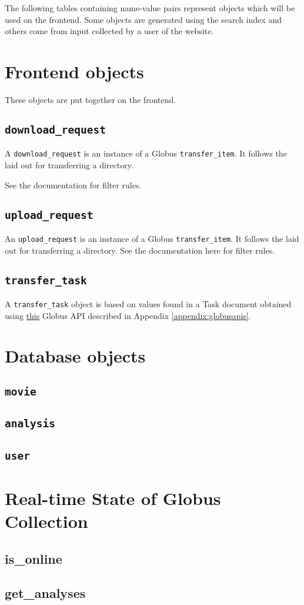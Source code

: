 
The following tables containing name-value pairs represent objects which will 
be used on the frontend. Some objects are generated using the search index and 
others come from input collected by a user of the website.

\section{Frontend objects}
These objects are put together on the frontend.

\subsection{\texttt{download\_request}}
A \texttt{download\_request} is an instance of a Globus \linkglobustransferitem
{\texttt{transfer\_item}}. It follows the  laid 
out for transferring a directory.



See the documentation  for filter rules.

\subsection{\texttt{upload\_request}}
An \texttt{upload\_request} is an instance of a Globus \linkglobustransferitem
{\texttt{transfer\_item}}. It follows the  laid 
out for transferring a directory. See the documentation here for \linkglobusfilterrules
{filter rules}.



\subsection{\texttt{transfer\_task}}
A \texttt{transfer\_task} object is based on values found in a \linkglobustaskdocument
{Task document} obtained using \hyperref[section:taskmanagement]{this} Globus API 
described in Appendix \ref{appendix:globusapis}.



\section{Database objects}
\subsection{\texttt{movie}}

\subsection{\texttt{analysis}}
\subsection{\texttt{user}}

\section{Real-time State of Globus Collection}
\subsection{is\_online}
\subsection{get\_analyses}

